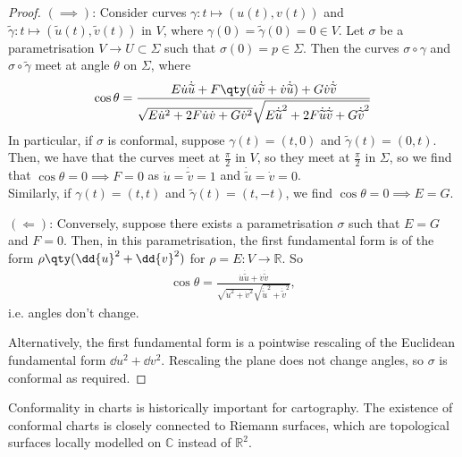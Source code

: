 \begin{proof}
	$(\implies)$: Consider curves $\gamma \colon t \mapsto (u(t), v(t))$ and $\widetilde \gamma \colon t \mapsto (\widetilde u(t), \widetilde v(t))$ in $V$, where $\gamma(0) = \widetilde \gamma(0) = 0 \in V$.
	Let $\sigma$ be a parametrisation $V \to U \subset \Sigma$ such that $\sigma(0) = p \in \Sigma$.
	Then the curves $\sigma \circ \gamma$ and $\sigma \circ \widetilde \gamma$ meet at angle $\theta$ on $\Sigma$, where
	\begin{align*}
		\cos \theta = \frac{E \dot u \dot {\widetilde u} + F \qty(\dot u \dot{\widetilde v} + \dot v \dot{\widetilde u}) + G \dot v \dot{\widetilde v}}{\sqrt{E \dot u^2 + 2F \dot u \dot v + G \dot v^2} \sqrt{E \dot{\widetilde u}^2 + 2F \dot{\widetilde u} \dot {\widetilde v} + G \dot{\widetilde v}^2}}
	\end{align*}
	In particular, if $\sigma$ is conformal, suppose $\gamma(t) = (t,0)$ and $\widetilde \gamma(t) = (0,t)$.
	Then, we have that the curves meet at $\frac{\pi}{2}$ in $V$, so they meet at $\frac{\pi}{2}$ in $\Sigma$, so we find that $\cos \theta = 0 \implies F = 0$ as $\dot{u} = \dot{\widetilde v} = 1$ and $\dot{\widetilde u} = \dot{v} = 0$. \\
	Similarly, if $\gamma(t) = (t,t)$ and $\widetilde \gamma(t) = (t,-t)$, we find $\cos \theta = 0 \implies E = G$.

	$(\Longleftarrow)$: Conversely, suppose there exists a parametrisation $\sigma$ such that $E = G$ and $F = 0$.
	Then, in this parametrisation, the first fundamental form is of the form $\rho \qty(\dd{u}^2 + \dd{v}^2)$ for $\rho = E \colon V \to \mathbb R$.
	So \begin{align*}
		\cos \theta = \frac{\dot u \dot {\widetilde u} + \dot v \dot{\widetilde v}}{\sqrt{\dot u^2 + \dot v^2} \sqrt{\dot{\widetilde u}^2 + \dot{\widetilde v}^2}},
	\end{align*} i.e. angles don't change.

	Alternatively, the first fundamental form is a pointwise rescaling of the Euclidean fundamental form $\dd{u}^2 + \dd{v}^2$.
	Rescaling the plane does not change angles, so $\sigma$ is conformal as required.
\end{proof}

\begin{remark}
	Conformality in charts is historically important for cartography.
	The existence of conformal charts is closely connected to Riemann surfaces, which are topological surfaces locally modelled on $\mathbb C$ instead of $\mathbb R^2$.
\end{remark}


